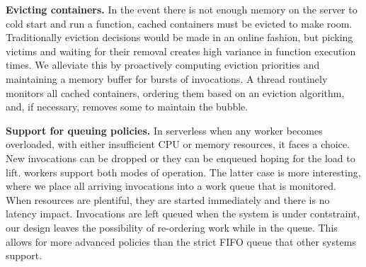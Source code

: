 \textbf{Evicting containers.}
In the event there is not enough memory on the server to cold start and run a function, cached containers must be evicted to make room.
Traditionally eviction decisions would be made in an online fashion, but picking victims and waiting for their removal creates high variance in function execution times.
We alleviate this by proactively computing eviction priorities and maintaining a memory buffer for bursts of invocations. 
A thread routinely monitors all cached containers, ordering them based on an eviction algorithm, and, if necessary, removes some to maintain the bubble.

\textbf{Support for queuing policies.}
In serverless when any worker becomes overloaded, with either insufficient CPU or memory resources, it faces a choice.
New invocations can be dropped or they can be enqueued hoping for the load to lift.
\sysname{} workers support both modes of operation.
The latter case is more interesting, where we place all arriving invocations into a work queue that is monitored.
When resources are plentiful, they are started immediately and there is no latency impact.
Invocations are left queued when the system is under contstraint, our design leaves the possibility of re-ordering work while in the queue.
This allows for more advanced policies than the strict FIFO queue that other systems support.

